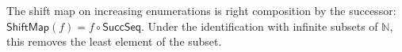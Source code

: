 \begin{definition}
The shift map on increasing enumerations is right composition by the
successor: $\mathsf{ShiftMap}(f)=f\circ\mathsf{SuccSeq}$.  Under the
identification with infinite subsets of $\mathbb N$, this removes the least
element of the subset.
\end{definition}
